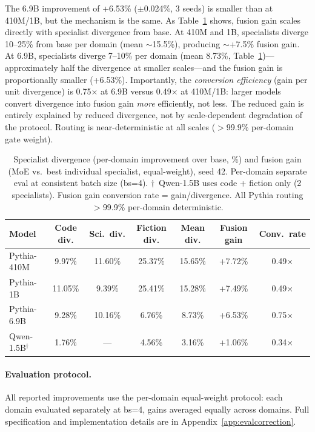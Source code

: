 \documentclass{article}
\begin{document}
The 6.9B improvement of +6.53\% ($\pm$0.024\%, 3 seeds) is smaller than at 410M/1B, but the mechanism is the same. As Table~\ref{tab:divergence} shows, fusion gain scales directly with specialist divergence from base. At 410M and 1B, specialists diverge 10--25\% from base per domain (mean $\sim$15.5\%), producing $\sim$+7.5\% fusion gain. At 6.9B, specialists diverge 7--10\% per domain (mean 8.73\%, Table~\ref{tab:divergence})---approximately half the divergence at smaller scales---and the fusion gain is proportionally smaller (+6.53\%). Importantly, the \emph{conversion efficiency} (gain per unit divergence) is 0.75$\times$ at 6.9B versus 0.49$\times$ at 410M/1B: larger models convert divergence into fusion gain \emph{more} efficiently, not less. The reduced gain is entirely explained by reduced divergence, not by scale-dependent degradation of the protocol. Routing is near-deterministic at all scales ($>$99.9\% per-domain gate weight).

\begin{table}[h]
\centering
\caption{Specialist divergence (per-domain improvement over base, \%) and fusion gain (MoE vs.\ best individual specialist, equal-weight), seed 42. Per-domain separate eval at consistent batch size (bs=4). $\dagger$~Qwen-1.5B uses code + fiction only (2 specialists). Fusion gain conversion rate = gain/divergence. All Pythia routing $>$99.9\% per-domain deterministic.}
\label{tab:divergence}
\small
\begin{tabular}{lcccccc}
\toprule
\textbf{Model} & \textbf{Code div.} & \textbf{Sci.\ div.} & \textbf{Fiction div.} & \textbf{Mean div.} & \textbf{Fusion gain} & \textbf{Conv.\ rate} \\
\midrule
Pythia-410M         & 9.97\%  & 11.60\% & 25.37\% & 15.65\% & +7.72\% & 0.49$\times$ \\
Pythia-1B           & 11.05\% & 9.39\%  & 25.41\% & 15.28\% & +7.49\% & 0.49$\times$ \\
Pythia-6.9B         & 9.28\%  & 10.16\% & 6.76\%  & 8.73\%  & +6.53\% & 0.75$\times$ \\
Qwen-1.5B$^\dagger$ & 1.76\%  & ---     & 4.56\%  & 3.16\%  & +1.06\% & 0.34$\times$ \\
\bottomrule
\end{tabular}
\end{table}

\paragraph{Evaluation protocol.} All reported improvements use the per-domain equal-weight protocol: each domain evaluated separately at bs=4, gains averaged equally across domains. Full specification and implementation details are in Appendix~\ref{app:evalcorrection}.
\end{document}

